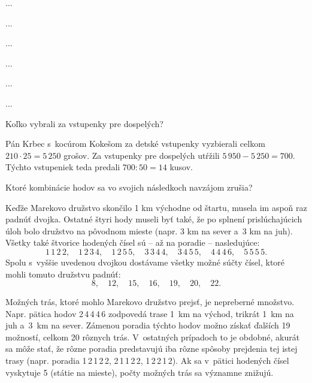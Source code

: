 ﻿{%
...}

{%
...}

{%
...}

{%
...}

{%
...}

{%
...}

{%
\napad
Koľko vybrali za vstupenky pre dospelých?

\riesenie
Pán Krbec s~kocúrom Kokešom za detské vstupenky vyzbierali celkom ${210\cdot25} =5\,250$ grošov.
Za vstupenky pre dospelých utŕžili $5\,950-5\,250=700$.
Týchto vstupeniek teda predali $700:50=14$ kusov.
}

{%
\napad
Ktoré kombinácie hodov sa vo svojich následkoch navzájom zrušia?

\riesenie
Keďže Marekovo družstvo skončilo 1 km východne od štartu, musela im aspoň raz padnúť dvojka.
Ostatné štyri hody museli byť také, že po splnení prislúchajúcich úloh bolo družstvo na pôvodnom mieste
(napr. 3 km na sever a~3 km na juh).
Všetky také štvorice hodených čísel sú -- až na poradie -- nasledujúce:
$$
1\,1\,2\,2,\quad 1\,2\,3\,4,\quad 1\,2\,5\,5,\quad 3\,3\,4\,4,\quad 3\,4\,5\,5,\quad 4\,4\,4\,6,\quad 5\,5\,5\,5.
$$
Spolu s~vyššie uvedenou dvojkou dostávame všetky možné súčty čísel, ktoré mohli tomuto družstvu padnúť:
$$
8,\quad 12,\quad 15,\quad 16,\quad 19,\quad 20,\quad 22.
$$

Možných trás, ktoré mohlo Marekovo družstvo prejsť, je nepreberné množstvo.
Napr. pätica hodov 2\,4\,4\,4\,6 zodpovedá trase 1~km na východ, trikrát 1~km na juh a~3~km na sever.
Zámenou poradia týchto hodov možno získať ďalších 19 možností, celkom 20 rôznych trás.
V~ostatných prípadoch to je obdobné, akurát sa môže stať, že rôzne poradia predstavujú iba rôzne spôsoby prejdenia tej istej trasy (napr. poradia 1\,2\,1\,2\,2, 2\,1\,1\,2\,2, 1\,2\,2\,1\,2).
Ak sa v~pätici hodených čísel vyskytuje 5 (státie na mieste), počty možných trás sa významne znižujú.
}

